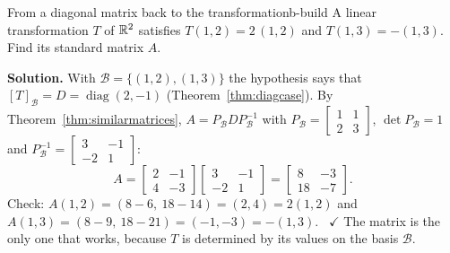 \documentclass[11pt]{article}
\begin{document}
\begin{exmp}{From a diagonal matrix back to the transformation}{b-build}
A linear transformation $T$ of $\mathbb{R}^2$ satisfies $T(1,2)=2\,(1,2)$ and $T(1,3)=-(1,3)$. Find its standard matrix $A$.

\textbf{Solution.} With $\mathcal{B}=\{(1,2),(1,3)\}$ the hypothesis says that $[T]_{\mathcal{B}}=D=\operatorname{diag}(2,-1)$ (Theorem~\ref{thm:diagcase}). By Theorem~\ref{thm:similarmatrices}, $A=P_{\mathcal{B}}DP_{\mathcal{B}}^{-1}$ with $P_{\mathcal{B}}=\begin{bmatrix}1&1\\2&3\end{bmatrix}$, $\det P_{\mathcal{B}}=1$ and $P_{\mathcal{B}}^{-1}=\begin{bmatrix}3&-1\\-2&1\end{bmatrix}$:
\[
A=\begin{bmatrix}2&-1\\4&-3\end{bmatrix}\begin{bmatrix}3&-1\\-2&1\end{bmatrix}=\begin{bmatrix}8&-3\\18&-7\end{bmatrix}.
\]
Check: $A(1,2)=(8-6,\ 18-14)=(2,4)=2(1,2)$ and $A(1,3)=(8-9,\ 18-21)=(-1,-3)=-(1,3)$. \ $\checkmark$ The matrix is the only one that works, because $T$ is determined by its values on the basis $\mathcal{B}$.
\end{exmp}
\end{document}

